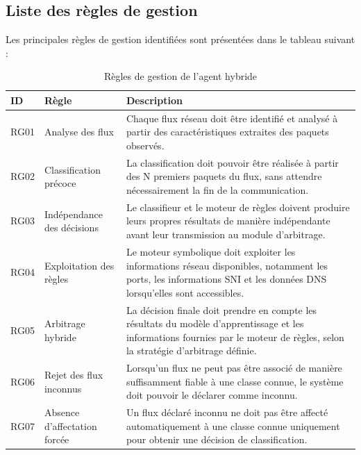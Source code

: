 \subsection{Liste des règles de gestion}

Les principales règles de gestion identifiées sont présentées
dans le tableau suivant :

\begin{table}[H]
\centering
\caption{Règles de gestion de l'agent hybride}
\label{tab:regles-gestion}
\small
\begin{tabularx}{\textwidth}{|p{1.4cm}|p{3.2cm}|Y|}
\hline
\textbf{ID} & \textbf{Règle} & \textbf{Description} \\
\hline

RG01 & Analyse des flux &
Chaque flux réseau doit être identifié et analysé à partir
des caractéristiques extraites des paquets observés. \\
\hline

RG02 & Classification précoce &
La classification doit pouvoir être réalisée à partir des
N premiers paquets du flux, sans attendre nécessairement
la fin de la communication. \\
\hline

RG03 & Indépendance des décisions &
Le classifieur et le moteur de règles doivent produire
leurs propres résultats de manière indépendante avant
leur transmission au module d'arbitrage. \\
\hline

RG04 & Exploitation des règles &
Le moteur symbolique doit exploiter les informations réseau
disponibles, notamment les ports, les informations SNI
et les données DNS lorsqu'elles sont accessibles. \\
\hline

RG05 & Arbitrage hybride &
La décision finale doit prendre en compte les résultats
du modèle d'apprentissage et les informations fournies
par le moteur de règles, selon la stratégie d'arbitrage
définie. \\
\hline

RG06 & Rejet des flux inconnus &
Lorsqu'un flux ne peut pas être associé de manière
suffisamment fiable à une classe connue, le système doit
pouvoir le déclarer comme inconnu. \\
\hline

RG07 & Absence d'affectation forcée &
Un flux déclaré inconnu ne doit pas être affecté
automatiquement à une classe connue uniquement pour
obtenir une décision de classification. \\
\hline


\end{tabularx}
\end{table}
